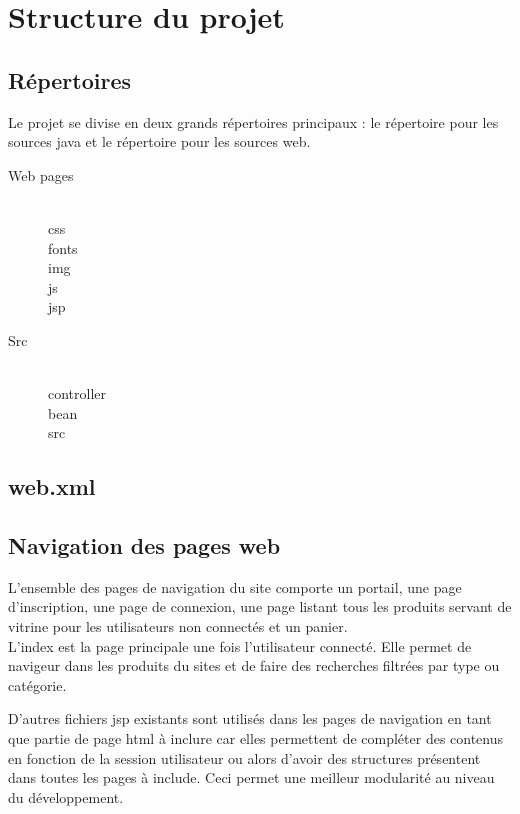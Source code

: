 \section{Structure du projet}

\subsection{Répertoires}

Le projet se divise en deux grands répertoires principaux : le répertoire pour 
les sources java et le répertoire pour les sources web.

\begin{description}
	\item[Web pages] \hfill \\
		css \\
		fonts \\
		img \\
		js \\
		jsp
	\item[Src] \hfill \\
		controller \\
		bean \\
		src
\end{description}

\subsection{web.xml}



\subsection{Navigation des pages web}

L'ensemble des pages de navigation du site comporte un portail, une page 
d'inscription, une page de connexion, une page listant tous les produits servant 
de vitrine pour les utilisateurs non connectés et un panier. \\

L'index est la page principale une fois l'utilisateur connecté. Elle permet de 
navigeur dans les produits du sites et de faire des recherches filtrées par 
type ou catégorie.

D'autres fichiers jsp existants sont utilisés dans les pages de navigation en 
tant que partie de page html à inclure car elles permettent de compléter des 
contenus en fonction de la session utilisateur ou alors d'avoir des structures 
présentent dans toutes les pages à include. Ceci permet une meilleur modularité 
au niveau du développement.

